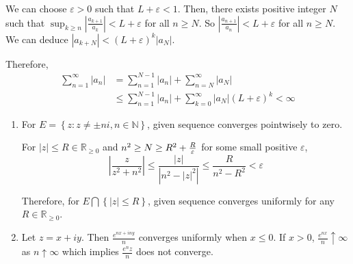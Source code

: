 \begin{problem}
	We can choose $\varepsilon > 0 $ such that $L + \varepsilon < 1$. Then, there exists positive integer $N$ such that $\sup_{k\geq n} \left| \frac{a_{k+1}}{a_k} \right | < L + \varepsilon $ for all $n \geq N$. So $\left | \frac{a_{n+1}}{a_n} \right | < L + \varepsilon$ for all $n \geq N$. We can deduce $\left | a_{k+N} \right | < \left( L + \varepsilon  \right) ^k \left| a_N \right |$. 

	Therefore,
	\begin{equation}
		\begin{split}
			\sum_{n=1}^{\infty} \left | a_n \right |& = \sum_{n=1}^{N-1} \left| a_n \right | + \sum_{n=N}^{\infty}\left | a_N \right | \\
			&\leq \sum_{n=1}^{N-1} \left | a_n \right | + \sum_{k=0}^{\infty}\left | a_N \right | \left( L + \varepsilon \right)^k < \infty
		\end{split}
		\label{7}
	\end{equation}
\end{problem}

\begin{problem}
	\hfill
	\begin{enumerate}[label = (\alph*)]
		\item For $E = \left\{ z : z \ne \pm n i, n\in \mathbb{N} \right\}$, given sequence converges pointwisely to zero.

			For  $|z| \leq R \in \mathbb{R}_{\ge 0}$ and $n^2 \geq N \ge R^2 + {R \over \varepsilon}$ for some small positive $\varepsilon$, 
			\begin{equation}
			\left | \frac{z }{ z^2 + n^2} \right | \leq \frac{|z|}{\left | n^2 - |z|^2 \right | }\leq \frac{R}{n^2 - R^2} < \varepsilon
				\label{9}
			\end{equation}

			Therefore, for $E \bigcap \left\{ |z| \leq R \right\}$, given sequence converges uniformly for any $R \in \mathbb{R}_{\geq 0}$. 
		\item Let $z = x+iy$. Then $\frac{e^{nx + iny}}{n} $ converges uniformly when $x\leq 0$. If $x > 0$, $\frac{e^{nx}}{n} \uparrow \infty$  as $ n\uparrow \infty$ which implies $\frac{e^nz}{n}$ does not converge.
	\end{enumerate}
\end{problem}

